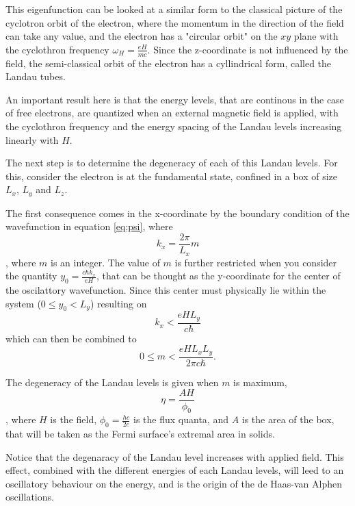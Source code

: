 \documentclass[prd,amsfonts,onecolumn,superscriptaddress,aps,nofootinbib,11pt]{revtex4}
\begin{document}
This eigenfunction can be looked at a similar form to the classical picture of the cyclotron orbit of the electron, where the momentum in the direction of the field can take any value, and the electron has a "circular orbit" on the $xy$ plane with the cyclothron frequency $\omega_H = \frac{e H}{mc}$. Since the z-coordinate is not influenced by the field, the semi-classical orbit of the electron has a cyllindrical form, called the Landau tubes.


An important result here is that the energy levels, that are continous in the case of free electrons, are quantized when an external magnetic field is applied, with the cyclothron frequency and the energy spacing of the Landau levels increasing linearly with $H$.

The next step is to determine the degeneracy of each of this Landau levels. For this, consider the electron is at the fundamental state, confined in a box of size $L_x$, $L_y$ and $L_z$.


The first consequence comes in the x-coordinate by the boundary condition of the wavefunction in equation \ref{eq:psi}, where 
\begin{equation}
    k_x = \frac{2 \pi }{L_x}m
\end{equation}
, where $m$ is an integer. The value of $m$ is further restricted when you consider the quantity $y_0 = \frac{c \hbar k_x}{e H}$, that can be thought as the y-coordinate for the center of the oscilattory wavefunction. Since this center must physically lie within the system ($0\leq y_0 < L_y $) resulting on
\begin{equation}
    k_x < \frac{e H L_y}{c \hbar}
\end{equation}
which can then be combined to 
\begin{equation}
    0 \leq m < \frac{e H L_x L_y}{2 \pi c \hbar} .
\end{equation}

The degeneracy of the Landau levels is given when $m$ is maximum,
\begin{equation}\label{eq:degeneracy}
    \eta = \frac{A H}{\phi_0}
\end{equation}
, where $H$ is the field, $\phi_0 = \frac{hc}{2e}$ is the flux quanta, and $A$ is the area of the box, that will be taken as the Fermi surface's extremal area in solids.


Notice that the degenaracy of the Landau level increases with applied field. This effect, combined with the different energies of each Landau levels, will leed to an oscillatory behaviour on the energy, and is the origin of the de Haas-van Alphen oscillations. 
\end{document}
